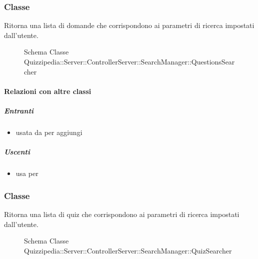 \subsubsection{Classe }
Ritorna una lista di domande che corrispondono ai parametri di ricerca impostati dall'utente.
\begin{figure}[H]
\centering
\noindent{}
\caption[Schema Classe QuestionsSearcher]{Schema Classe Quizzipedia::Server::ControllerServer::SearchManager::QuestionsSearcher}
\end{figure}
\paragraph{Relazioni con altre classi}
\subparagraph{Entranti}
\begin{itemize}
\item usata da  per aggiungi
\end{itemize}
\subparagraph{Uscenti}
\begin{itemize}
\item usa  per 
\end{itemize}
\subsubsection{Classe }
Ritorna una lista di quiz che corrispondono ai parametri di ricerca impostati dall'utente.
\begin{figure}[H]
\centering
\noindent{}
\caption[Schema Classe QuizSearcher]{Schema Classe Quizzipedia::Server::ControllerServer::SearchManager::QuizSearcher}
\end{figure}
